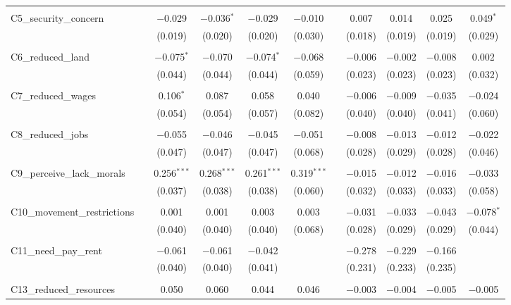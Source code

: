 \begin{table}[H]
\begin{tabular}{@{\extracolsep{4pt}}lcccccccccc}
  & & & & & & & & & & \\ 
 C5\_security\_concern &  & $-$0.029 & $-$0.036$^{*}$ & $-$0.029 & $-$0.010 &  & 0.007 & 0.014 & 0.025 & 0.049$^{*}$ \\ 
  &  & (0.019) & (0.020) & (0.020) & (0.030) &  & (0.018) & (0.019) & (0.019) & (0.029) \\ 
  & & & & & & & & & & \\ 
 C6\_reduced\_land &  & $-$0.075$^{*}$ & $-$0.070 & $-$0.074$^{*}$ & $-$0.068 &  & $-$0.006 & $-$0.002 & $-$0.008 & 0.002 \\ 
  &  & (0.044) & (0.044) & (0.044) & (0.059) &  & (0.023) & (0.023) & (0.023) & (0.032) \\ 
  & & & & & & & & & & \\ 
 C7\_reduced\_wages &  & 0.106$^{*}$ & 0.087 & 0.058 & 0.040 &  & $-$0.006 & $-$0.009 & $-$0.035 & $-$0.024 \\ 
  &  & (0.054) & (0.054) & (0.057) & (0.082) &  & (0.040) & (0.040) & (0.041) & (0.060) \\ 
  & & & & & & & & & & \\ 
 C8\_reduced\_jobs &  & $-$0.055 & $-$0.046 & $-$0.045 & $-$0.051 &  & $-$0.008 & $-$0.013 & $-$0.012 & $-$0.022 \\ 
  &  & (0.047) & (0.047) & (0.047) & (0.068) &  & (0.028) & (0.029) & (0.028) & (0.046) \\ 
  & & & & & & & & & & \\ 
 C9\_perceive\_lack\_morals &  & 0.256$^{***}$ & 0.268$^{***}$ & 0.261$^{***}$ & 0.319$^{***}$ &  & $-$0.015 & $-$0.012 & $-$0.016 & $-$0.033 \\ 
  &  & (0.037) & (0.038) & (0.038) & (0.060) &  & (0.032) & (0.033) & (0.033) & (0.058) \\ 
  & & & & & & & & & & \\ 
 C10\_movement\_restrictions &  & 0.001 & 0.001 & 0.003 & 0.003 &  & $-$0.031 & $-$0.033 & $-$0.043 & $-$0.078$^{*}$ \\ 
  &  & (0.040) & (0.040) & (0.040) & (0.068) &  & (0.028) & (0.029) & (0.029) & (0.044) \\ 
  & & & & & & & & & & \\ 
 C11\_need\_pay\_rent &  & $-$0.061 & $-$0.061 & $-$0.042 &  &  & $-$0.278 & $-$0.229 & $-$0.166 &  \\ 
  &  & (0.040) & (0.040) & (0.041) &  &  & (0.231) & (0.233) & (0.235) &  \\ 
  & & & & & & & & & & \\ 
 C13\_reduced\_resources &  & 0.050 & 0.060 & 0.044 & 0.046 &  & $-$0.003 & $-$0.004 & $-$0.005 & $-$0.005 \\ 

\end{tabular}
\end{table}
